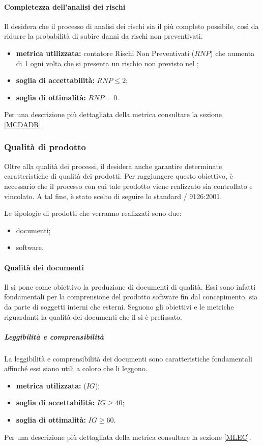 \paragraph{Completezza dell'analisi dei rischi}
\label{OCDADR}
Il  desidera che il processo di analisi dei rischi sia il più completo possibile, così da ridurre la probabilità di subire danni da rischi non preventivati.
\begin{itemize}
	\item \textbf{metrica utilizzata:} contatore Rischi Non Preventivati ($RNP$) che aumenta di 1 ogni volta che si presenta un rischio non previsto nel \pdpv; 
	\item \textbf{soglia di accettabilità:} $RNP\leq2$;
	\item \textbf{soglia di ottimalità:} $RNP=0$.
\end{itemize}
Per una descrizione più dettagliata della metrica consultare la sezione \ref{MCDADR}

\subsubsection{Qualità di prodotto}
Oltre alla qualità dei processi, il  desidera anche garantire determinate caratteristiche di qualità dei prodotti. Per raggiungere questo obiettivo, è necessario che il processo con cui tale prodotto viene realizzato sia controllato e vincolato. A tal fine, è stato scelto di seguire lo standard / 9126:2001.

Le tipologie di prodotti che verranno realizzati sono due:
\begin{itemize}
	\item documenti;
	\item software.
\end{itemize}
\paragraph{Qualità dei documenti}
Il  si pone come obiettivo la produzione di documenti di qualità. Essi sono infatti fondamentali per la comprensione del prodotto software fin dal concepimento, sia da parte di soggetti interni che esterni.
Seguono gli obiettivi e le metriche riguardanti la qualità dei documenti che il  si è prefissato.


\subparagraph{Leggibilità e comprensibilità}
\label{OLEC}
La leggibilità e comprensibilità dei documenti sono caratteristiche fondamentali affinché essi siano utili a coloro che li leggono.
\begin{itemize}
	\item \textbf{metrica utilizzata:}  ($IG$);
	\item \textbf{soglia di accettabilità:} $IG\geq 40$;
	\item \textbf{soglia di ottimalità:} $IG \geq 60$.
\end{itemize}
Per una descrizione più dettagliata della metrica consultare la sezione \ref{MLEC}.

